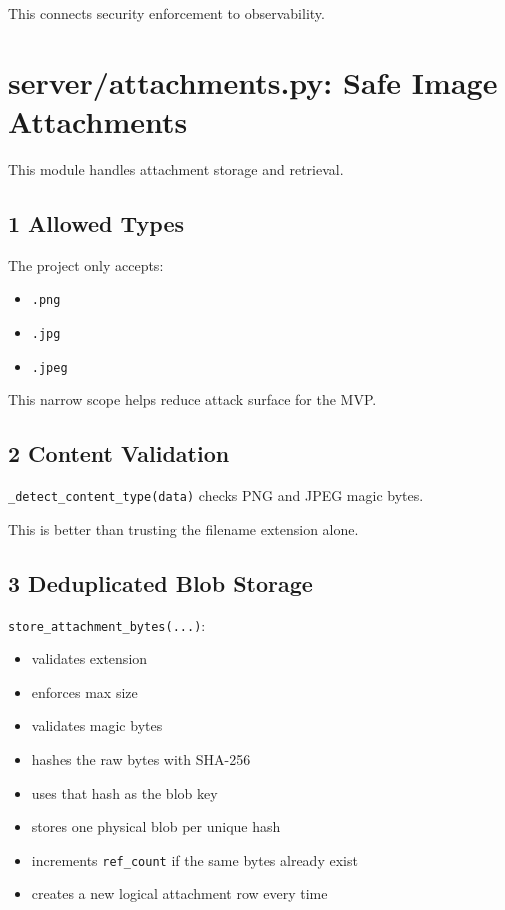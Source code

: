\documentclass[11pt,a4paper]{article}
\begin{document}
This connects security enforcement to observability.


\section{server/attachments.py: Safe Image Attachments}

This module handles attachment storage and retrieval.

\subsection{1 Allowed Types}

The project only accepts:

\begin{itemize}
\item \nolinkurl{.png}
\item \nolinkurl{.jpg}
\item \nolinkurl{.jpeg}
\end{itemize}

This narrow scope helps reduce attack surface for the MVP.

\subsection{2 Content Validation}

\nolinkurl{_detect_content_type(data)} checks PNG and JPEG magic bytes.

This is better than trusting the filename extension alone.

\subsection{3 Deduplicated Blob Storage}

\nolinkurl{store_attachment_bytes(...)}:

\begin{itemize}
\item validates extension
\item enforces max size
\item validates magic bytes
\item hashes the raw bytes with SHA-256
\item uses that hash as the blob key
\item stores one physical blob per unique hash
\item increments \nolinkurl{ref_count} if the same bytes already exist
\item creates a new logical attachment row every time
\end{itemize}
\end{document}
